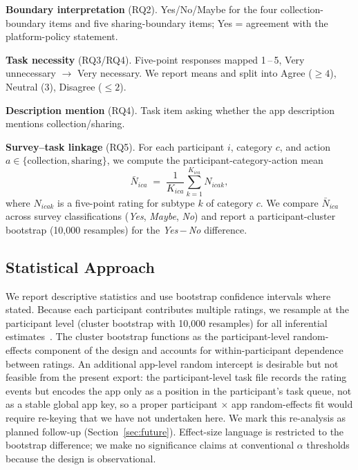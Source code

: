 \documentclass[11pt,a4paper]{article}
\begin{document}
\textbf{Boundary interpretation} (RQ2). Yes/No/Maybe for the four
collection-boundary items and five sharing-boundary items;
Yes = agreement with the platform-policy statement.

\textbf{Task necessity} (RQ3/RQ4). Five-point responses mapped
1\,--\,5, Very unnecessary $\to$ Very necessary. We report means and
split into Agree ($\geq 4$), Neutral (3), Disagree ($\leq 2$).

\textbf{Description mention} (RQ4). Task item asking whether the app
description mentions collection/sharing.

\textbf{Survey--task linkage} (RQ5). For each participant $i$, category
$c$, and action $a\in\{\text{collection},\text{sharing}\}$, we compute
the participant-category-action mean
\begin{equation}
\label{eq:pc-mean}
\bar{N}_{ica}\;=\;\frac{1}{K_{ica}}\sum_{k=1}^{K_{ica}} N_{icak},
\end{equation}
where $N_{icak}$ is a five-point rating for subtype $k$ of category
$c$. We compare $\bar{N}_{ica}$ across survey classifications
(\emph{Yes}, \emph{Maybe}, \emph{No}) and report a participant-cluster
bootstrap (10{,}000 resamples) for the \emph{Yes}\,$-$\,\emph{No}
difference.

\subsection{Statistical Approach}
\label{subsec:stat-approach}

We report descriptive statistics and use bootstrap confidence intervals
where stated. Because each participant contributes multiple ratings,
we resample at the participant level (cluster bootstrap with 10{,}000
resamples) for all inferential
estimates~\citep{wijesekera:etal:2015,naeini:etal:2017}. The cluster
bootstrap functions as the participant-level random-effects component
of the design and accounts for within-participant dependence between
ratings. An additional app-level random intercept is desirable but
not feasible from the present export: the participant-level task file
records the rating events but encodes the app only as a position in
the participant's task queue, not as a stable global app key, so a
proper participant $\times$ app random-effects fit would require
re-keying that we have not undertaken here. We mark this re-analysis
as planned follow-up (Section~\ref{sec:future}). Effect-size language
is restricted to the bootstrap difference; we make no significance
claims at conventional $\alpha$ thresholds because the design is
observational.
\end{document}
